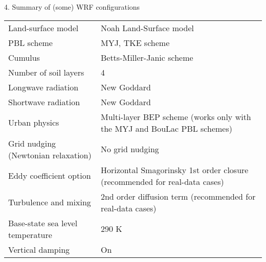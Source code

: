 \documentclass[xcolor=table]{beamer}
\begin{document}
\begin{frame}[fragile, allowframebreaks=.9, t]{4. Summary of (some) WRF configurations}
\begin{longtable}{ p{4.1cm}  |  p{7cm}}
Land-surface model                  & Noah Land-Surface model                                 \\
PBL scheme                          	& MYJ, TKE scheme                                                    \\
Cumulus                             		& Betts-Miller-Janic scheme                                                  \\
Number of soil layers               & 4                                                                          \\
Longwave radiation                  & New Goddard                                                                \\
Shortwave radiation                 & New Goddard                                                                \\
Urban physics                       	& Multi-layer BEP scheme (works only with the MYJ and BouLac PBL schemes)    \\
Grid nudging (Newtonian relaxation) & No grid nudging                                                            \\
Eddy coefficient option             & Horizontal Smagorinsky 1st order closure (recommended for real-data cases) \\
Turbulence and mixing               & 2nd order diffusion term (recommended for real-data cases)                 \\
Base-state sea level temperature    & 290 K  \\
Vertical damping 						& On \\
\hline
\end{longtable}
\end{frame}
\end{document}
